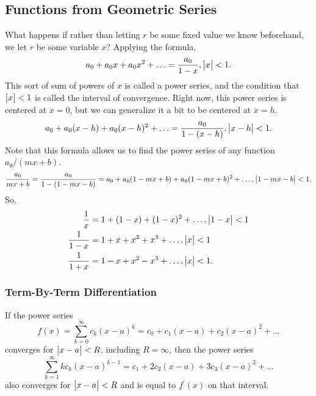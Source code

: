 \subsection{Functions from Geometric Series}
What happens if rather than letting $r$ be some fixed value we know beforehand, we let $r$ be some variable $x$?
Applying the formula,
\begin{equation*}
	a_0 + a_0x + a_0x^2 + \ldots = \frac{a_0}{1-x}, \big\lvert x \big\rvert < 1.
\end{equation*}
This sort of sum of powers of $x$ is called a power series, and the condition that $\big\lvert x \big\rvert<1$ is called the interval of convergence.
Right now, this power series is centered at $x=0$, but we can generalize it a bit to be centered at $x=h$.
\begin{equation*}
	a_0 + a_0(x-h) + a_0(x-h)^2 + \ldots = \frac{a_0}{1-(x-h)}, \big\lvert x-h \big\rvert < 1.
\end{equation*}
Note that this formula allows us to find the power series of any function $a_0/(mx+b)$.
\begin{equation*}
	\frac{a_0}{mx + b} = \frac{a_0}{1-(1-mx-b)} = a_0 + a_0(1-mx+b) + a_0(1-mx+b)^2 + \ldots, \big\lvert 1-mx-b \big\rvert < 1.
\end{equation*}
So,
\begin{align*}
	\frac{1}{x} &= 1 + (1-x) + (1-x)^2 + \ldots, \big\lvert 1-x \big\rvert < 1 \\
	\frac{1}{1-x} &= 1 + x + x^2 + x^3 + \ldots, \big\lvert x \big\rvert < 1 \\
	\frac{1}{1+x} &= 1 - x + x^2 - x^3 + \ldots, \big\lvert x \big\rvert < 1.
\end{align*}

\subsubsection{Term-By-Term Differentiation}
\begin{theorem}
	If the power series
	\begin{equation*}
		f(x) = \sum_{k=0}^{\infty}{c_k(x-a)^k} = c_0 + c_1(x-a) + c_2(x-a)^2 + \ldots
	\end{equation*}
	converges for $\big\lvert x-a \big\rvert < R$, including $R=\infty$, then the power series
	\begin{equation*}
		\sum_{k=1}^{\infty}{kc_k(x-a)^{k-1}} = c_1 + 2c_2(x-a) + 3c_3(x-a)^2 + \ldots
	\end{equation*}
	also converges for $\big\lvert x-a \big\rvert < R$ and is equal to $f^\prime(x)$ on that interval.
\end{theorem}

